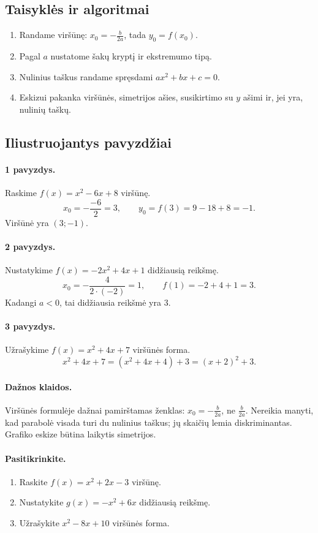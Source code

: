 \subsection{Taisyklės ir algoritmai}

\begin{enumerate}
\item Randame viršūnę: $x_0=-\frac{b}{2a}$, tada $y_0=f(x_0)$.
\item Pagal $a$ nustatome šakų kryptį ir ekstremumo tipą.
\item Nulinius taškus randame spręsdami $ax^2+bx+c=0$.
\item Eskizui pakanka viršūnės, simetrijos ašies, susikirtimo su $y$ ašimi ir, jei yra, nulinių taškų.
\end{enumerate}

\subsection{Iliustruojantys pavyzdžiai}

\paragraph{1 pavyzdys.}
Raskime $f(x)=x^2-6x+8$ viršūnę.
\[
x_0=-\frac{-6}{2}=3,\qquad y_0=f(3)=9-18+8=-1.
\]
Viršūnė yra $(3;-1)$.

\paragraph{2 pavyzdys.}
Nustatykime $f(x)=-2x^2+4x+1$ didžiausią reikšmę.
\[
x_0=-\frac{4}{2\cdot(-2)}=1,\qquad f(1)=-2+4+1=3.
\]
Kadangi $a<0$, tai didžiausia reikšmė yra $3$.

\paragraph{3 pavyzdys.}
Užrašykime $f(x)=x^2+4x+7$ viršūnės forma.
\[
x^2+4x+7=(x^2+4x+4)+3=(x+2)^2+3.
\]

\paragraph{Dažnos klaidos.}
Viršūnės formulėje dažnai pamirštamas ženklas: $x_0=-\frac{b}{2a}$, ne $\frac{b}{2a}$. Nereikia manyti, kad parabolė visada turi du nulinius taškus; jų skaičių lemia diskriminantas. Grafiko eskize būtina laikytis simetrijos.

\paragraph{Pasitikrinkite.}
\begin{enumerate}
\item Raskite $f(x)=x^2+2x-3$ viršūnę.
\item Nustatykite $g(x)=-x^2+6x$ didžiausią reikšmę.
\item Užrašykite $x^2-8x+10$ viršūnės forma.
\end{enumerate}

